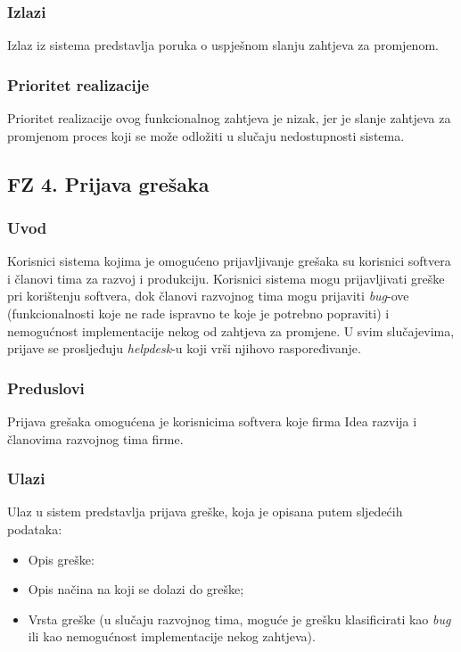 \documentclass[12pt,a4paper]{article}
\begin{document}
\subsubsection{Izlazi}

Izlaz iz sistema predstavlja poruka o uspješnom slanju zahtjeva za promjenom.

\subsubsection{Prioritet realizacije}

Prioritet realizacije ovog funkcionalnog zahtjeva je nizak, jer je slanje zahtjeva za promjenom proces koji se može odložiti u slučaju nedostupnosti sistema.

\subsection{FZ 4. Prijava grešaka}

\subsubsection{Uvod}

Korisnici sistema kojima je omogućeno prijavljivanje grešaka su korisnici softvera i članovi tima za razvoj i produkciju. Korisnici sistema mogu prijavljivati greške pri korištenju softvera, dok članovi razvojnog tima mogu prijaviti \textit{bug}-ove (funkcionalnosti koje ne rade ispravno te koje je potrebno popraviti) i nemogućnost implementacije nekog od zahtjeva za promjene. U svim slučajevima, prijave se prosljeđuju \textit{helpdesk}-u koji vrši njihovo raspoređivanje.

\subsubsection{Preduslovi}

Prijava grešaka omogućena je korisnicima softvera koje firma Idea razvija i članovima razvojnog tima firme.

\subsubsection{Ulazi}

Ulaz u sistem predstavlja prijava greške, koja je opisana putem sljedećih podataka:

\begin{itemize}
\item Opis greške:
\item Opis načina na koji se dolazi do greške;
\item Vrsta greške (u slučaju razvojnog tima, moguće je grešku klasificirati kao \textit{bug} ili kao nemogućnost implementacije nekog zahtjeva).
\end{itemize}
\end{document}
